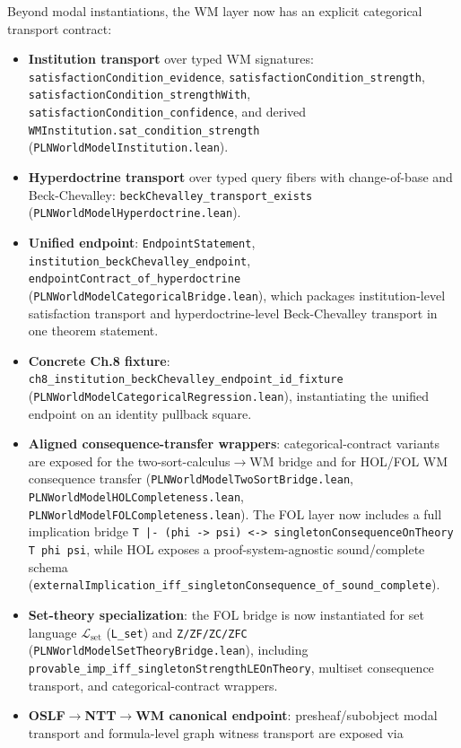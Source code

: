 \documentclass[]{article}
\newcommand{\code}[1]{\texttt{#1}}
\begin{document}
Beyond modal instantiations, the WM layer now has an explicit categorical
transport contract:
\begin{itemize}[leftmargin=2em]
\item \textbf{Institution transport} over typed WM signatures:
  \code{satisfactionCondition\_evidence},
  \code{satisfactionCondition\_strength},
  \code{satisfactionCondition\_strengthWith},
  \code{satisfactionCondition\_confidence},
  and derived \code{WMInstitution.sat\_condition\_strength}
  (\code{PLNWorldModelInstitution.lean}).
\item \textbf{Hyperdoctrine transport} over typed query fibers with
  change-of-base and Beck-Chevalley:
  \code{beckChevalley\_transport\_exists}
  (\code{PLNWorldModelHyperdoctrine.lean}).
\item \textbf{Unified endpoint}:
  \code{EndpointStatement},
  \code{institution\_beckChevalley\_endpoint},
  \code{endpointContract\_of\_hyperdoctrine}
  (\code{PLNWorldModelCategoricalBridge.lean}),
  which packages institution-level satisfaction transport and
  hyperdoctrine-level Beck-Chevalley transport in one theorem statement.
\item \textbf{Concrete Ch.8 fixture}:
  \code{ch8\_institution\_beckChevalley\_endpoint\_id\_fixture}
  (\code{PLNWorldModelCategoricalRegression.lean}),
  instantiating the unified endpoint on an identity pullback square.
\item \textbf{Aligned consequence-transfer wrappers}:
  categorical-contract variants are exposed for the two-sort-calculus$\rightarrow$WM
  bridge and for HOL/FOL WM consequence transfer
  (\code{PLNWorldModelTwoSortBridge.lean},
   \code{PLNWorldModelHOLCompleteness.lean},
   \code{PLNWorldModelFOLCompleteness.lean}).
  The FOL layer now includes a full implication bridge
  \code{T |- (phi -> psi) <-> singletonConsequenceOnTheory T phi psi},
  while HOL exposes a proof-system-agnostic sound/complete schema
  (\code{externalImplication\_iff\_singletonConsequence\_of\_sound\_complete}).
\item \textbf{Set-theory specialization}: the FOL bridge is now instantiated for
  set language $\mathcal L_{\mathrm{set}}$ (\code{L\_set}) and
  \code{Z/ZF/ZC/ZFC}
  (\code{PLNWorldModelSetTheoryBridge.lean}), including
  \code{provable\_imp\_iff\_singletonStrengthLEOnTheory},
  multiset consequence transport, and categorical-contract wrappers.
\item \textbf{OSLF$\rightarrow$NTT$\rightarrow$WM canonical endpoint}: presheaf/subobject
  modal transport and formula-level graph witness transport are exposed via

\end{itemize}
\end{document}
